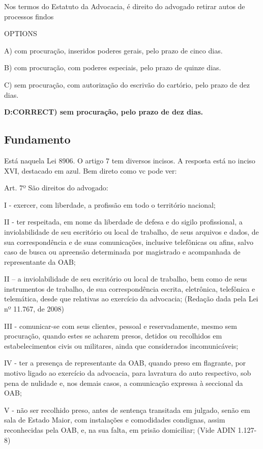\documentclass[12pt]{article}
\begin{document}
Nos termos do Estatuto da Advocacia, é direito do advogado 
retirar autos de processos findos 
 
OPTIONS

A) com procuração, inseridos poderes gerais, pelo prazo de 
cinco dias.  

B) com procuração, com poderes especiais, pelo prazo de 
quinze dias. 

C) sem procuração, com autorização do escrivão do cartório, 
pelo prazo de dez dias. 

\textbf{D:CORRECT) sem procuração, pelo prazo de dez dias.}

\subsection{Fundamento}

Está naquela Lei 8906. O artigo 7 tem diversos incisos. A resposta está no inciso XVI, destacado em azul. Bem direto como vc pode ver:

Art. 7º São direitos do advogado:

I - exercer, com liberdade, a profissão em todo o território nacional;

II - ter respeitada, em nome da liberdade de defesa e do sigilo profissional, a inviolabilidade de seu escritório ou local de trabalho, de seus arquivos e dados, de sua correspondência e de suas comunicações, inclusive telefônicas ou afins, salvo caso de busca ou apreensão determinada por magistrado e acompanhada de representante da OAB;

II – a inviolabilidade de seu escritório ou local de trabalho, bem como de seus instrumentos de trabalho, de sua correspondência escrita, eletrônica, telefônica e telemática, desde que relativas ao exercício da advocacia; (Redação dada pela Lei nº 11.767, de 2008)

III - comunicar-se com seus clientes, pessoal e reservadamente, mesmo sem procuração, quando estes se acharem presos, detidos ou recolhidos em estabelecimentos civis ou militares, ainda que considerados incomunicáveis;

IV - ter a presença de representante da OAB, quando preso em flagrante, por motivo ligado ao exercício da advocacia, para lavratura do auto respectivo, sob pena de nulidade e, nos demais casos, a comunicação expressa à seccional da OAB;

V - não ser recolhido preso, antes de sentença transitada em julgado, senão em sala de Estado Maior, com instalações e comodidades condignas, assim reconhecidas pela OAB, e, na sua falta, em prisão domiciliar;         (Vide ADIN 1.127-8)
\end{document}
